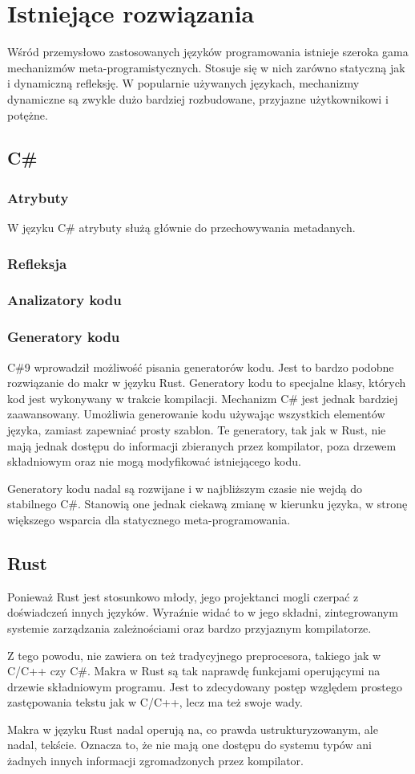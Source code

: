 \section{Istniejące rozwiązania}
Wśród przemysłowo zastosowanych języków programowania istnieje szeroka gama mechanizmów meta-programistycznych. Stosuje się w nich zarówno statyczną jak i dynamiczną refleksję. W popularnie używanych językach, mechanizmy dynamiczne są zwykle dużo bardziej rozbudowane, przyjazne użytkownikowi i potężne.
\subsection{C\#}
\subsubsection{Atrybuty}
W języku C\# atrybuty służą głównie do przechowywania metadanych.
\subsubsection{Refleksja}
\subsubsection{Analizatory kodu}
\subsubsection{Generatory kodu}
C\#9 wprowadził możliwość pisania generatorów kodu. Jest to bardzo podobne rozwiązanie do makr w języku Rust. Generatory kodu to specjalne klasy, których kod jest wykonywany w trakcie kompilacji. 
Mechanizm C\# jest jednak bardziej zaawansowany. Umożliwia generowanie kodu używając wszystkich elementów języka, zamiast zapewniać prosty szablon. Te generatory, tak jak w Rust, nie mają jednak dostępu do informacji zbieranych przez kompilator, poza drzewem składniowym oraz nie mogą modyfikować istniejącego kodu.\par
Generatory kodu nadal są rozwijane i w najbliższym czasie nie wejdą do stabilnego C\#. Stanowią one jednak ciekawą zmianę w kierunku języka, w stronę większego wsparcia dla statycznego meta-programowania.
\subsection {Rust}
Ponieważ Rust jest stosunkowo młody, jego projektanci mogli czerpać z doświadczeń innych języków. Wyraźnie widać to w jego składni, zintegrowanym systemie zarządzania zależnościami oraz bardzo przyjaznym kompilatorze.\par
Z tego powodu, nie zawiera on też tradycyjnego preprocesora, takiego jak w C/C++ czy C\#. Makra w Rust są tak naprawdę funkcjami operującymi na drzewie składniowym programu. Jest to zdecydowany postęp względem prostego zastępowania tekstu jak w C/C++, lecz ma też swoje wady.\par
Makra w języku Rust nadal operują na, co prawda ustrukturyzowanym, ale nadal, tekście. Oznacza to, że nie mają one dostępu do systemu typów ani żadnych innych informacji zgromadzonych przez kompilator.\par
